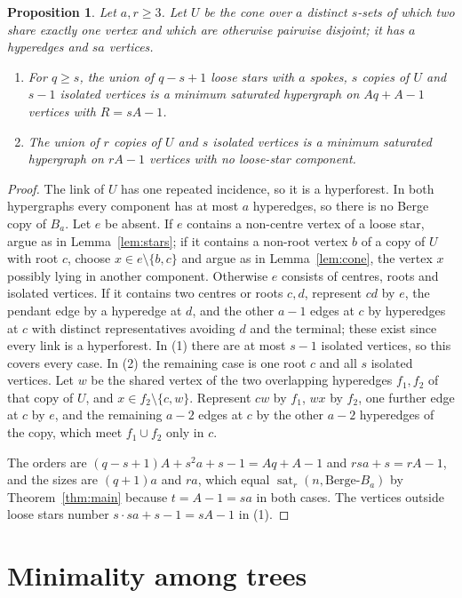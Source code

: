 \documentclass[11pt]{article}
\newtheorem{proposition}[theorem]{Proposition}
\theoremstyle{definition}
\theoremstyle{remark}
\newcommand{\sat}{\operatorname{sat}}
\newcommand{\BB}{\text{Berge-}B_a}
\begin{document}
\begin{proposition}\label{prop:sharp}
Let $a,r\ge3$. Let $U$ be the cone over $a$ distinct $s$-sets of which two
share exactly one vertex and which are otherwise pairwise disjoint; it has
$a$ hyperedges and $sa$ vertices.
\begin{enumerate}
\item For $q\ge s$, the union of $q-s+1$ loose stars with $a$ spokes, $s$
copies of $U$ and $s-1$ isolated vertices is a minimum saturated hypergraph
on $Aq+A-1$ vertices with $R=sA-1$.
\item The union of $r$ copies of $U$ and $s$ isolated vertices is a minimum
saturated hypergraph on $rA-1$ vertices with no loose-star component.
\end{enumerate}
\end{proposition}

\begin{proof}
The link of $U$ has one repeated incidence, so it is a hyperforest. In both
hypergraphs every component has at most $a$ hyperedges, so there is no
Berge copy of $B_a$. Let $e$ be absent. If $e$ contains a non-centre vertex
of a loose star, argue as in Lemma~\ref{lem:stars}; if it contains a
non-root vertex $b$ of a copy of $U$ with root $c$, choose $x\in
e\setminus\{b,c\}$ and argue as in Lemma~\ref{lem:cone}, the vertex $x$
possibly lying in another component. Otherwise $e$ consists of centres,
roots and isolated vertices. If it contains two centres or roots $c,d$,
represent $cd$ by $e$, the pendant edge by a hyperedge at $d$, and the
other $a-1$ edges at $c$ by hyperedges at $c$ with distinct representatives
avoiding $d$ and the terminal; these exist since every link is a
hyperforest. In (1) there are at most $s-1$ isolated vertices, so this
covers every case. In (2) the remaining case is one root $c$ and all $s$
isolated vertices. Let $w$ be the shared vertex of the two overlapping
hyperedges $f_1,f_2$ of that copy of $U$, and $x\in f_2\setminus\{c,w\}$.
Represent $cw$ by $f_1$, $wx$ by $f_2$, one further edge at $c$ by $e$, and
the remaining $a-2$ edges at $c$ by the other $a-2$ hyperedges of the copy,
which meet $f_1\cup f_2$ only in $c$.

The orders are $(q-s+1)A+s^2a+s-1=Aq+A-1$ and $rsa+s=rA-1$, and the sizes
are $(q+1)a$ and $ra$, which equal $\sat_r(n,\BB)$ by
Theorem~\ref{thm:main} because $t=A-1=sa$ in both cases. The vertices
outside loose stars number $s\cdot sa+s-1=sA-1$ in (1).
\end{proof}

\section{Minimality among trees}\label{sec:trees}
\end{document}
